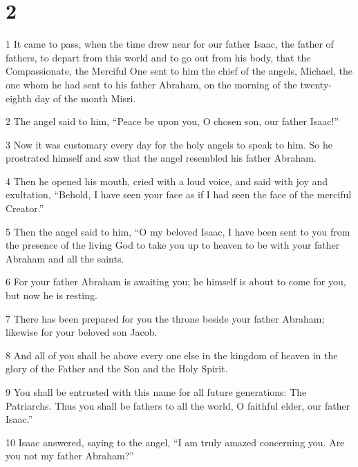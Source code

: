 \chapter{2}

\par 1 It came to pass, when the time drew near for our father Isaac, the father of fathers, to depart from this world and to go out from his body, that the Compassionate, the Merciful One sent to him the chief of the angels, Michael, the one whom he had sent to his father Abraham, on the morning of the twenty-eighth day of the month Misri. 

\par 2 The angel said to him, “Peace be upon you, O chosen son, our father Isaac!” 

\par 3 Now it was customary every day for the holy angels to speak to him. So he prostrated himself and saw that the angel resembled his father Abraham. 

\par 4 Then he opened his mouth, cried with a loud voice, and said with joy and exultation, “Behold, I have seen your face as if I had seen the face of the merciful Creator.”

\par 5 Then the angel said to him, “O my beloved Isaac, I have been sent to you from the presence of the living God to take you up to heaven to be with your father Abraham and all the saints. 

\par 6 For your father Abraham is awaiting you; he himself is about to come for you, but now he is resting. 

\par 7 There has been prepared for you the throne beside your father Abraham; likewise for your beloved son Jacob. 

\par 8 And all of you shall be above every one else in the kingdom of heaven in the glory of the Father and the Son and the Holy Spirit. 

\par 9 You shall be entrusted with this name for all future generations: The Patriarchs. Thus you shall be fathers to all the world, O faithful elder, our father Isaac.”

\par 10 Isaac answered, saying to the angel, “I am truly amazed concerning you. Are you not my father Abraham?”

